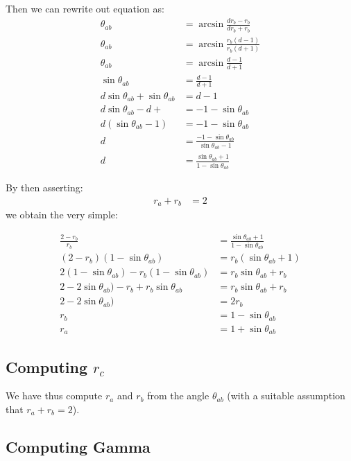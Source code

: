 \documentclass{article}
\begin{document}
Then we can rewrite out equation as:
\begin{align}
  \theta_{ab} &= \arcsin{\frac{d r_b - r_b}{d r_b + r_b}} \\
  \theta_{ab} &= \arcsin{\frac{r_b (d  - 1)}{r_b (d  + 1)}} \\
  \theta_{ab} &= \arcsin{\frac{d - 1}{d + 1}} \\
  \sin{\theta_{ab}} &= \frac{d - 1}{d + 1} \\
  d\sin{\theta_{ab}} + \sin{\theta_{ab}} &= d-1 \\
  d\sin{\theta_{ab}} -d +  &= -1 -\sin{\theta_{ab}} \\
  d(\sin{\theta_{ab}} -1)  &= -1 -\sin{\theta_{ab}} \\
  d &= \frac{-1 -\sin{\theta_{ab}}}{\sin{\theta_{ab}} -1} \\
  d &= \frac{\sin{\theta_{ab}} + 1}{1 - \sin{\theta_{ab}}}
\end{align}

By then asserting:
\begin{align}
r_a + r_b &= 2
\end{align}
we obtain the very simple:

\begin{align}
  \frac{2-r_b}{r_b} &=  \frac{\sin{\theta_{ab}} + 1}{1 - \sin{\theta_{ab}}} \\
  (2-r_b)(1 - \sin{\theta_{ab}}) &= r_b(\sin{\theta_{ab}} + 1) \\
  2(1 - \sin{\theta_{ab}}) -r_b(1 - \sin{\theta_{ab}}) &= r_b\sin{\theta_{ab}} + r_b \\
  2 - 2\sin{\theta_{ab}}) -r_b + r_b\sin{\theta_{ab}} &= r_b\sin{\theta_{ab}} + r_b \\
  2 - 2\sin{\theta_{ab}})  &=  2 r_b \\
  r_b &= 1 - \sin{\theta_{ab}} \\
  r_a &= 1 + \sin{\theta_{ab}}
\end{align}

\subsection{Computing $r_c$}

We have thus compute $r_a$ and $r_b$ from the angle $\theta_{ab}$ (with a suitable assumption that $r_a+r_b=2$).


\subsection{Computing Gamma}
\end{document}
